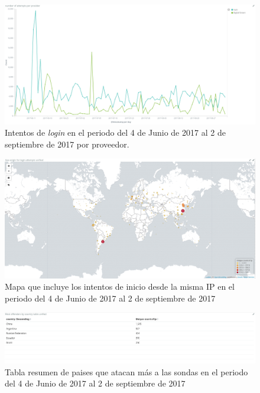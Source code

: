   \begin{figure}
    \centering
      \includegraphics[scale=0.3]{images/ElasticAttemptsPerProvider}
    \caption{Intentos de \emph{login} en el periodo del 4 de Junio de 2017 al 2 de septiembre de 2017 por proveedor.}
    \label{fig:data-attempts-per-provider}
  \end{figure}

  \begin{figure}
    \centering
      \includegraphics[scale=0.3]{images/ElasticMapUnified}
    \caption{Mapa que incluye los intentos de inicio desde la misma IP en el periodo del 4 de Junio de 2017 al 2 de septiembre de 2017}
    \label{fig:data-map-unified}
  \end{figure}

  \begin{figure}
    \centering
      \includegraphics[scale=0.3]{images/ElasticTableByCountryUnified}
    \caption{Tabla resumen de paises que atacan más a las sondas en el periodo del 4 de Junio de 2017 al 2 de septiembre de 2017}
    \label{fig:data-table-by-country-unified}
  \end{figure}

